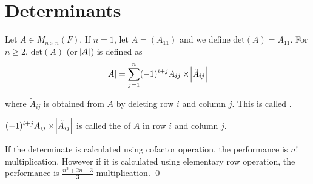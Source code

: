 \section{Determinants}

\begin{definition}
	Let $A \in M_{n \times n} (F)$. If $n =1$, let $A=(A_{11})$ and we define $\text{det}(A) = A_{11}$. For $n \geq 2$, $\text{det}(A)$ (or $\abs{A}$) is defined as
	\begin{equation}
		\abs{A} = \sum_{j=1}^n (-1)^{i + j} A_{ij} \times \abs{\tilde{A}_{ij}}
	\end{equation}
	
	where $\tilde{A}_{ij}$ is obtained from $A$ by deleting row $i$ and column $j$. This is called .
	
	$(-1)^{i + j} A_{ij} \times \abs{\tilde{A}_{ij}}$ is called the  of $A$ in row $i$ and column $j$.
	
	If the determinate is calculated using cofactor operation, the performance is $n!$ multiplication. However if it is calculated using elementary row operation, the performance is $\displaystyle \frac{n^3 + 2n - 3}{3}$ multiplication.
	\qed
\end{definition}


